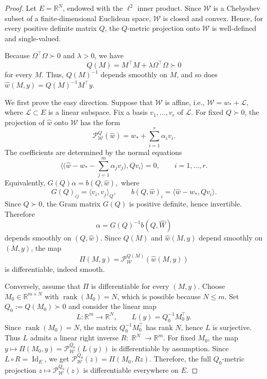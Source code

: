 \documentclass{article}
\DeclareMathOperator{\R}{\mathbb{R}}
\begin{document}
\begin{proof}
Let \(E=\mathbb R^{N}\), endowed with the $\ell^2$ inner product.
Since \(\mathscr W\) is a Chebyshev subset of a finite-dimensional Euclidean
space, \(\mathscr W\) is closed and convex. Hence, for every positive definite
matrix \(Q\), the \(Q\)-metric projection onto \(\mathscr W\) is well-defined
and single-valued.

Because \(\Omega ^\top\Omega\succ0\) and \(\lambda>0\), we have
\[
Q(M)=M^\top M+\lambda\Omega^\top\Omega\succ0
\]
for every \(M\). Thus, \(Q(M)^{-1}\) depends smoothly on \(M\), and so does $
\widehat w(M,y)= Q(M)^{-1}M^\top y.$

We first prove the easy direction. Suppose that \(\mathscr W\) is affine, i.e., $\mathscr W=w_*+\mathscr L,$ where \(\mathscr L\subset E\) is a linear subspace. Fix a basis
\(v_1,\dots,v_r\) of \(\mathscr L\). For fixed \(Q\succ0\), the projection of
\(\widehat w\) onto \(\mathscr W\) has the form
\[
\mathcal P_{\mathscr W}^Q(\widehat w)
=
w_*+\sum_{i=1}^r \alpha_i v_i.
\]
The coefficients are determined by the normal equations
\[
\langle
\Big(\widehat w-w_*-\sum_{j=1}^m \alpha_j v_j\Big)
,Q v_i
\rangle=0,
\qquad i=1,\dots,r.
\]
Equivalently, $G(Q)\alpha=b(Q,\widehat w),$ where
\[
G(Q)_{ij} = \langle v_i,v_j \rangle_{Q},
\qquad
b(Q,\widehat w)_i=\langle\widehat w-w_*, Q v_i \rangle.
\]
Since \(Q\succ0\), the Gram matrix \(G(Q)\) is positive definite, hence
invertible. Therefore
\[
\alpha=G(Q)^{-1}b(Q,\widehat W)
\]
depends smoothly on \((Q,\widehat w)\). Since \(Q(M)\) and
\(\widehat w(M,y)\) depend smoothly on \((M,y)\), the map
\[
\Pi(M,y)=\mathcal P_{\mathscr W}^{Q(M)}(\widehat w(M,y))
\]
is differentiable, indeed smooth.

Conversely, assume that \(\Pi\) is differentiable for every \((M,y)\).
Choose \(M_0\in\mathbb R^{m\times N}\) with \(\operatorname{rank}(M_0)=N\),
which is possible because \(N \leq m\). Set $Q_0:=Q(M_0)\succ0$ and consider the linear map
\[
L:\mathbb R^{m}\to \mathbb R^{N},
\qquad
L(y)= Q_0^{-1} M_0^\top y.
\]
Since \(\operatorname{rank}(M_0)=N\), the matrix \(Q_0^{-1} M_0^\top\) has rank
\(N\), hence \(L\) is surjective. Thus \(L\) admits a linear right inverse
\(R:\R^N\to\mathbb R^{m}\).
For fixed \(M_0\), the map $
y\mapsto \Pi(M_0,y) = \mathcal P_{\mathscr W}^{Q_0}(L(y))$
is differentiable by assumption. Since \(L\circ R=\operatorname{Id}_E\), we get $\mathcal P_{\mathscr W}^{Q_0}(z) =
\Pi(M_0,Rz)$.
Therefore, the full \(Q_0\)-metric projection $
z\mapsto \mathcal P_{\mathscr W}^{Q_0}(z)$ is differentiable everywhere on \(E\).


\end{proof}
\end{document}
